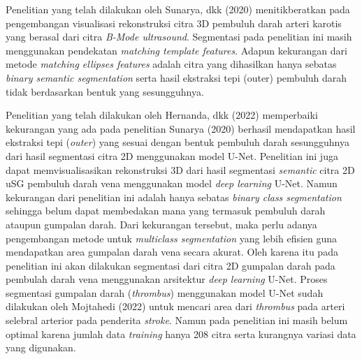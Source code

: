 Penelitian yang telah dilakukan oleh Sunarya, dkk (2020)\cite{made2020} menitikberatkan pada pengembangan visualisasi rekonstruksi citra 3D pembuluh darah arteri karotis yang berasal dari citra \textit{B-Mode ultrasound}. Segmentasi pada penelitian ini masih menggunakan pendekatan \textit{matching template features}. Adapun kekurangan dari metode \textit{matching ellipses features} adalah citra yang dihasilkan hanya sebatas \textit{binary semantic segmentation} serta hasil ekstraksi tepi (outer) pembuluh darah tidak berdasarkan bentuk yang sesungguhnya.

Penelitian yang telah dilakukan oleh Hernanda, dkk (2022)\cite{arta1} memperbaiki kekurangan yang ada pada penelitian Sunarya (2020)\cite{made2020} berhasil mendapatkan hasil ekstraksi tepi (\textit{outer}) yang sesuai dengan bentuk pembuluh darah sesungguhnya dari hasil segmentasi citra 2D menggunakan model U-Net. Penelitian ini juga dapat memvisualisasikan rekonstruksi 3D dari hasil segmentasi \textit{semantic} citra 2D uSG pembuluh darah vena menggunakan model \textit{deep learning} U-Net. Namun kekurangan dari penelitian ini adalah hanya sebatas \textit{binary class segmentation} sehingga belum dapat membedakan mana yang termasuk pembuluh darah ataupun gumpalan darah. Dari kekurangan tersebut, maka perlu adanya pengembangan metode untuk \textit{multiclass segmentation} yang lebih efisien guna mendapatkan area gumpalan darah vena secara akurat. Oleh karena itu pada penelitian ini akan dilakukan segmentasi dari citra 2D gumpalan darah pada pembulah darah vena menggunakan arsitektur \textit{deep learning} U-Net. Proses segmentasi gumpalan darah (\textit{thrombus}) menggunakan model U-Net sudah dilakukan oleh Mojtahedi (2022) \cite{mojtahedi2022fully} untuk mencari area dari \textit{thrombus} pada arteri selebral arterior pada penderita \textit{stroke}. Namun pada penelitian ini masih belum optimal karena jumlah data \textit{training} hanya 208 citra serta kurangnya variasi data yang digunakan.




